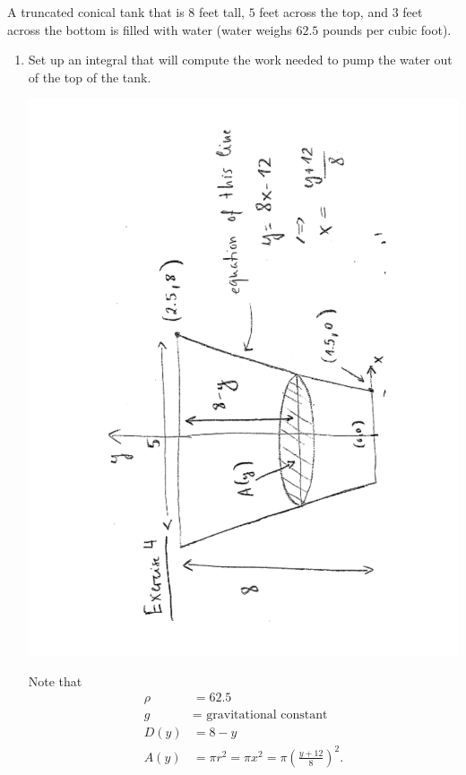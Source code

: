\documentclass[]{ximera}
\begin{document}
\begin{problem}
A truncated conical tank that is $8$ feet tall, $5$ feet across the top, and $3$ feet across the bottom is filled with water (water weighs $62.5$ pounds per cubic foot).  
\begin{enumerate}
		\item  Set up an integral that will compute the work needed to pump the water out of the top of the tank.  
		\begin{freeResponse}
			\begin{image}
			\includegraphics[trim= 120 320 100 180, angle=-89.99, scale=0.6]{Figure6-7-1.pdf}
			\end{image}
		
		Note that
			\begin{align*}
			\rho &= 62.5  \\
			g &= \text{ gravitational constant}  \\
			D(y) &= 8-y  \\
			A(y) &= \pi r^2 = \pi x^2 = \pi \left( \frac{y+12}{8} \right)^2.
			\end{align*}
		

\end{freeResponse}
\end{enumerate}
\end{problem}
\end{document}
